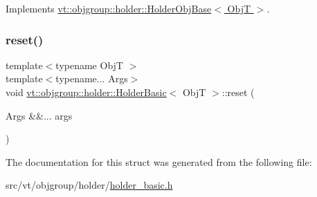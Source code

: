 Implements \hyperlink{structvt_1_1objgroup_1_1holder_1_1_holder_obj_base_a4b350b0126259d31a62fd426a08f6698}{vt\+::objgroup\+::holder\+::\+Holder\+Obj\+Base$<$ Obj\+T $>$}.

\mbox{\label{structvt_1_1objgroup_1_1holder_1_1_holder_basic_ae0e03732280c6c1cf44f9ff8f24426c2}} 
\subsubsection{\texorpdfstring{reset()}{reset()}}
{\footnotesize\ttfamily template$<$typename ObjT $>$ \\
template$<$typename... Args$>$ \\
void \hyperlink{structvt_1_1objgroup_1_1holder_1_1_holder_basic}{vt\+::objgroup\+::holder\+::\+Holder\+Basic}$<$ ObjT $>$\+::reset (\begin{DoxyParamCaption}\item[{Args \&\&...}]{args }\end{DoxyParamCaption})\hspace{0.3cm}{\ttfamily [inline]}}



The documentation for this struct was generated from the following file\+:\begin{DoxyCompactItemize}
\item 
src/vt/objgroup/holder/\hyperlink{holder__basic_8h}{holder\+\_\+basic.\+h}\end{DoxyCompactItemize}
